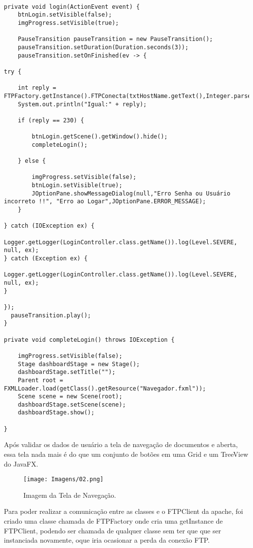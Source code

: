 \documentclass[12pt]{article}
\begin{document}
\begin{lstlisting}

private void login(ActionEvent event) {
	btnLogin.setVisible(false);
	imgProgress.setVisible(true);
	
	PauseTransition pauseTransition = new PauseTransition();
	pauseTransition.setDuration(Duration.seconds(3));
	pauseTransition.setOnFinished(ev -> {

try {
	
	int reply = FTPFactory.getInstance().FTPConecta(txtHostName.getText(),Integer.parseInt(txtHostPort.getText()),this.txtUsername.getText(),this.txtPassword.getText());
	System.out.println("Igual:" + reply);
	
	if (reply == 230) {
	
		btnLogin.getScene().getWindow().hide();
		completeLogin();
	
	} else {
	
		imgProgress.setVisible(false);
		btnLogin.setVisible(true);
		JOptionPane.showMessageDialog(null,"Erro Senha ou Usuário incorreto !!", "Erro ao Logar",JOptionPane.ERROR_MESSAGE);
	}

} catch (IOException ex) {
	Logger.getLogger(LoginController.class.getName()).log(Level.SEVERE, null, ex);
} catch (Exception ex) {
	Logger.getLogger(LoginController.class.getName()).log(Level.SEVERE, null, ex);
}

});
  pauseTransition.play();
}

private void completeLogin() throws IOException {
	
	imgProgress.setVisible(false);
	Stage dashboardStage = new Stage();
	dashboardStage.setTitle("");
	Parent root = FXMLLoader.load(getClass().getResource("Navegador.fxml"));
	Scene scene = new Scene(root);
	dashboardStage.setScene(scene);
	dashboardStage.show();
	
}
\end{lstlisting}
Após validar os dados de usuário a tela de navegação de documentos e aberta, essa tela nada mais é do que um conjunto de botões em uma Grid e um TreeView do JavaFX.


\begin{figure}[H]
	\centering
	\texttt{[image: Imagens/02.png]}
	\caption{ Imagem da Tela de Navegação.}
	\label{fig:01}
\end{figure}

Para poder realizar a comunicação entre as classes e o FTPClient da apache, foi criado uma classe chamada de FTPFactory onde cria uma getInstance de FTPClient, podendo ser chamada de qualquer classe sem ter que que ser instanciada novamente, oque iria ocasionar a perda da conexão FTP.
\end{document}
